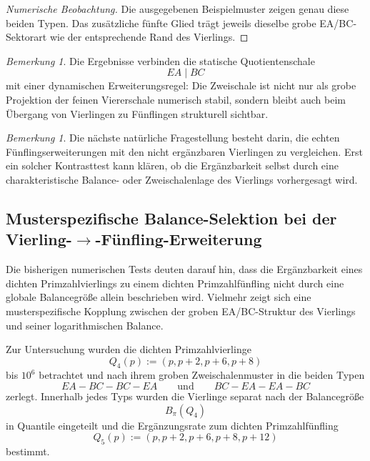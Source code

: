 \documentclass[11pt,a4paper]{article}
\theoremstyle{definition}
\theoremstyle{remark}
\newtheorem{bemerkung}[satz]{Bemerkung}
\begin{document}
	\begin{proof}[Numerische Beobachtung]
		Die ausgegebenen Beispielmuster zeigen genau diese beiden Typen. Das zusätzliche fünfte
		Glied trägt jeweils dieselbe grobe EA/BC-Sektorart wie der entsprechende Rand des
		Vierlings.
	\end{proof}
	
	\begin{bemerkung}
		Die Ergebnisse verbinden die statische Quotientenschale
		\[
		EA\mid BC
		\]
		mit einer dynamischen Erweiterungsregel: Die Zweischale ist nicht nur als grobe Projektion
		der feinen Viererschale numerisch stabil, sondern bleibt auch beim Übergang von
		Vierlingen zu Fünflingen strukturell sichtbar.
	\end{bemerkung}
	
	\begin{bemerkung}
		Die nächste natürliche Fragestellung besteht darin, die echten Fünflingserweiterungen mit
		den nicht ergänzbaren Vierlingen zu vergleichen. Erst ein solcher Kontrasttest kann
		klären, ob die Ergänzbarkeit selbst durch eine charakteristische Balance- oder
		Zweischalenlage des Vierlings vorhergesagt wird.
	\end{bemerkung}
	
	\subsection{Musterspezifische Balance-Selektion bei der Vierling-\(\to\)-Fünfling-Erweiterung}
	
	Die bisherigen numerischen Tests deuten darauf hin, dass die Ergänzbarkeit eines dichten
	Primzahlvierlings zu einem dichten Primzahlfünfling nicht durch eine globale Balancegröße
	allein beschrieben wird. Vielmehr zeigt sich eine musterspezifische Kopplung zwischen der
	groben EA/BC-Struktur des Vierlings und seiner logarithmischen Balance.
	
	Zur Untersuchung wurden die dichten Primzahlvierlinge
	\[
	Q_4(p):=(p,p+2,p+6,p+8)
	\]
	bis \(10^6\) betrachtet und nach ihrem groben Zweischalenmuster in die beiden Typen
	\[
	EA-BC-BC-EA
	\qquad\text{und}\qquad
	BC-EA-EA-BC
	\]
	zerlegt. Innerhalb jedes Typs wurden die Vierlinge separat nach der Balancegröße
	\[
	B_\pi(Q_4)
	\]
	in Quantile eingeteilt und die Ergänzungsrate zum dichten Primzahlfünfling
	\[
	Q_5(p):=(p,p+2,p+6,p+8,p+12)
	\]
	bestimmt.
	
\end{document}
